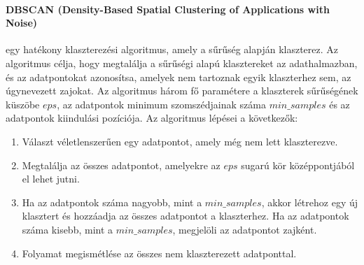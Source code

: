 \documentclass[12pt,a4paper]{article}
\begin{document}
\paragraph{DBSCAN (Density-Based Spatial Clustering of Applications with Noise)} egy hatékony klaszterezési algoritmus, amely a sűrűség alapján klaszterez. Az algoritmus célja, hogy megtalálja a sűrűségi alapú klasztereket az adathalmazban, és az adatpontokat azonosítsa, amelyek nem tartoznak egyik klaszterhez sem, az úgynevezett zajokat. Az algoritmus három fő paramétere a klaszterek sűrűségének küszöbe $eps$, az adatpontok minimum szomszédjainak száma $min\_samples$ és az adatpontok kiindulási pozíciója.
Az algoritmus lépései a következők:
\begin{enumerate}
    \item Választ véletlenszerűen egy adatpontot, amely még nem lett klaszterezve.
    \item Megtalálja az összes adatpontot, amelyekre az $eps$ sugarú kör középpontjából el lehet jutni.
    \item Ha az adatpontok száma nagyobb, mint a $min\_samples$, akkor létrehoz egy új klasztert és hozzáadja az összes adatpontot a klaszterhez. Ha az adatpontok száma kisebb, mint a $min\_samples$, megjelöli az adatpontot zajként.
    \item Folyamat megismétlése az összes nem klaszterezett adatponttal.
\end{enumerate}
\end{document}
